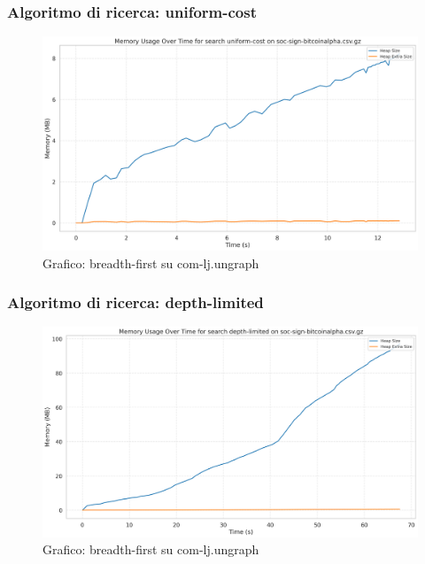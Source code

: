 \documentclass{article}
\begin{document}
\subsubsection{Algoritmo di ricerca: uniform-cost}
\begin{figure}[h]\centering
\includegraphics[width=\textwidth]{../plots/soc-sign-bitcoinalpha.csv_uniform-cost.png}
\caption{Grafico: breadth-first su com-lj.ungraph}
\end{figure}
\subsubsection{Algoritmo di ricerca: depth-limited}
\begin{figure}[h]\centering
\includegraphics[width=\textwidth]{../plots/soc-sign-bitcoinalpha.csv_depth-limited.png}
\caption{Grafico: breadth-first su com-lj.ungraph}
\end{figure}
\end{document}
